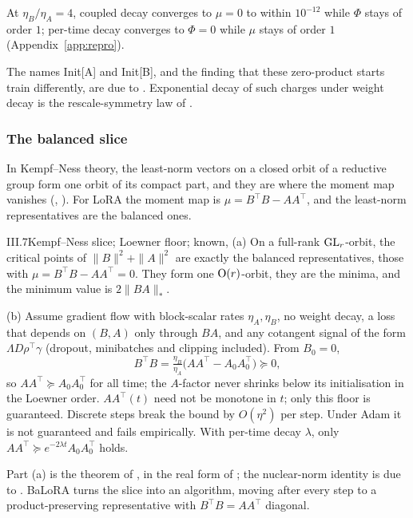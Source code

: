 \noindent{}\enspace At $\eta_B/\eta_A=4$, coupled decay converges to $\mu=0$ to within $10^{-12}$ while $\Phi$ stays of order $1$; per-time decay converges to $\Phi=0$ while $\mu$ stays of order $1$ (Appendix~\ref{app:repro}).

The names Init[A] and Init[B], and the finding that these zero-product starts train differently, are due to \citet{hayou2024impact}. Exponential decay of such charges under weight decay is the rescale-symmetry law of \citet{kunin2020neural}.

\subsubsection{The balanced slice}\label{sec:fibres-balance}

In Kempf--Ness theory, the least-norm vectors on a closed orbit of a reductive group form one orbit of its compact part, and they are where the moment map vanishes (, ). For LoRA the moment map is $\mu=B^\top B-AA^\top$, and the least-norm representatives are the balanced ones.

\begin{proposition}{III.7}{Kempf--Ness slice; Loewner floor; known, \citet{xkempf1979length,xsrebro2004maximum}}
(a) On a full-rank $\mathrm{GL}_r$-orbit, the critical points of $\|B\|^2+\|A\|^2$ are exactly the balanced representatives, those with $\mu=B^\top B-AA^\top=0$. They form one $\mathrm{O}(r)$-orbit, they are the minima, and the minimum value is $2\|BA\|_*$.

(b) Assume gradient flow with block-scalar rates $\eta_A,\eta_B$, no weight decay, a loss that depends on $(B,A)$ only through $BA$, and any cotangent signal of the form $\Lambda D\rho^\top\gamma$ (dropout, minibatches and clipping included). From $B_0=0$,
\[B^\top B=\tfrac{\eta_B}{\eta_A}\big(AA^\top-A_0A_0^\top\big)\succeq0,\]
so $AA^\top\succeq A_0A_0^\top$ for all time; the $A$-factor never shrinks below its initialisation in the Loewner order. $AA^\top(t)$ need not be monotone in $t$; only this floor is guaranteed. Discrete steps break the bound by $O(\eta^2)$ per step. Under Adam it is not guaranteed and fails empirically. With per-time decay $\lambda$, only $AA^\top\succeq e^{-2\lambda t}A_0A_0^\top$ holds.
\end{proposition}

Part (a) is the theorem of \citet{xkempf1979length}, in the real form of \citet{xrichardson1990minimum}; the nuclear-norm identity is due to \citet{xsrebro2004maximum}. BaLoRA \citep{castin2026balanced} turns the slice into an algorithm, moving after every step to a product-preserving representative with $B^\top B=AA^\top$ diagonal.

